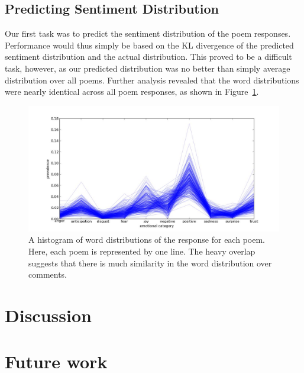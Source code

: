 \documentclass[11pt]{article}
\begin{document}
\subsection{Predicting Sentiment Distribution}
Our first task was to predict the sentiment distribution of the poem responses. Performance would thus simply be based on the KL divergence of the predicted sentiment distribution and the actual distribution. This proved to be a difficult task, however, as our predicted distribution was no better than simply average distribution over all poems. Further analysis revealed that the word distributions were nearly identical across all poem responses, as shown in Figure~\ref{histogram}.

\begin{figure}[ht]
\begin{center}
\includegraphics[scale=0.4]{../experiments/exp10.jpg}
\end{center}
\caption{A histogram of word distributions of the response for each poem. Here, each poem is represented by one line. The heavy overlap suggests that there is much similarity in the word distribution over comments.}
\label{histogram}
\end{figure}

\section{Discussion}



\section{Future work}
\end{document}
